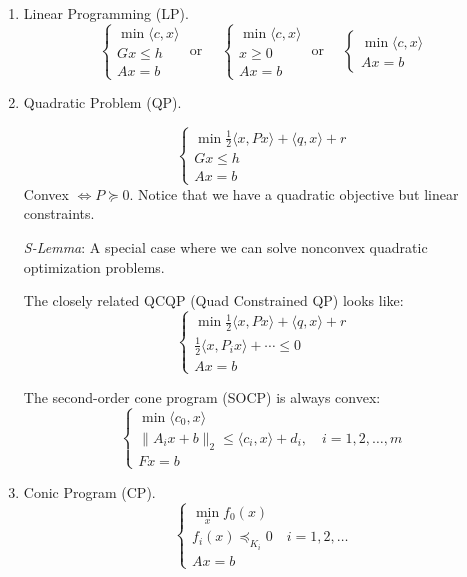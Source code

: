 \documentclass[english, 11pt]{article}
\begin{document}
\begin{enumerate}
\item{Linear Programming (LP)}. 
\[
\begin{cases} \min \langle c,x \rangle  \\
Gx \le h \\
Ax =b
\end{cases}
\text{ or } \quad 
\begin{cases} \min \langle c,x \rangle  \\
x \ge 0 \\
Ax =b
\end{cases}
\text{ or } \quad 
\begin{cases} \min \langle c,x \rangle  \\
Ax =b
\end{cases}
\]


\item{Quadratic Problem (QP)}. 

\[
\begin{cases} \min \frac{1}{2} \langle x, Px \rangle + \langle q,x \rangle + r  \\
Gx \le h \\
Ax =b
\end{cases}
\]
Convex $\iff P \succeq 0$. Notice that we have a quadratic objective but linear constraints. 

{\it S-Lemma}: A special case where we can solve nonconvex quadratic optimization problems.


The closely related QCQP (Quad Constrained QP) looks like:
\[
\begin{cases} \min \frac{1}{2} \langle x, Px \rangle + \langle q,x \rangle + r  \\
\frac{1}{2} \langle x, P_i x \rangle + \cdots \le 0 \\
Ax=b
\end{cases}
\]

The second-order cone program (SOCP) is always convex:
\[
\begin{cases} \min \langle c_0, x \rangle \\
\|A_i x + b\|_2 \le \langle c_i, x \rangle + d_i, \quad i=1,2,\dots,m \\
Fx=b
\end{cases}
\]


\item{Conic Program (CP).}
\[
\begin{cases} \min\limits_x f_0(x)  \\
f_i(x) \preceq_{K_i} 0 \quad i=1,2,\dots \\
Ax=b
\end{cases}
\]


\end{enumerate}
\end{document}
